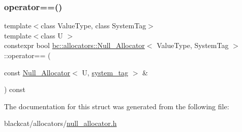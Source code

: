 \mbox{\label{structbc_1_1allocators_1_1Null__Allocator_a4543c27c3430516aa1b27e9c1b5f0601}} 
\subsubsection{\texorpdfstring{operator==()}{operator==()}}
{\footnotesize\ttfamily template$<$class Value\+Type, class System\+Tag$>$ \\
template$<$class U $>$ \\
constexpr bool \hyperlink{structbc_1_1allocators_1_1Null__Allocator}{bc\+::allocators\+::\+Null\+\_\+\+Allocator}$<$ Value\+Type, System\+Tag $>$\+::operator== (\begin{DoxyParamCaption}\item[{const \hyperlink{structbc_1_1allocators_1_1Null__Allocator}{Null\+\_\+\+Allocator}$<$ U, \hyperlink{structbc_1_1allocators_1_1Null__Allocator_a5accbd7634ecdda0a5dbf54c28815e9e}{system\+\_\+tag} $>$ \&}]{ }\end{DoxyParamCaption}) const\hspace{0.3cm}{\ttfamily [inline]}}



The documentation for this struct was generated from the following file\+:\begin{DoxyCompactItemize}
\item 
blackcat/allocators/\hyperlink{null__allocator_8h}{null\+\_\+allocator.\+h}\end{DoxyCompactItemize}
